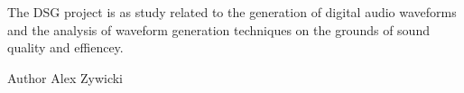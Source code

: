 The D\+S\+G project is as study related to the generation of digital audio waveforms and the analysis of waveform generation techniques on the grounds of sound quality and effiencey. \begin{DoxyAuthor}{Author}
Alex Zywicki 
\end{DoxyAuthor}
